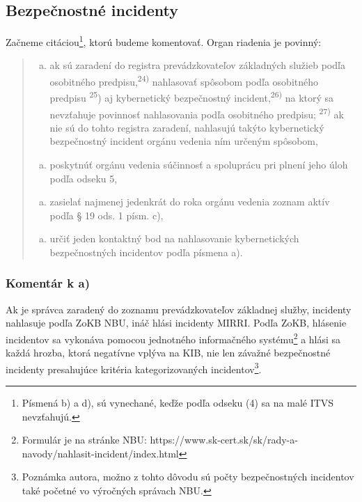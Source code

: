 \subsection{Bezpečnostné incidenty}
Začneme citáciou\footnote{Písmená b) a d), sú vynechané, keďže podľa odseku (4) sa na malé \acrshort{ITVS} nevzťahujú.},
ktorú budeme komentovať. Organ riadenia je povinný\cite[\S 23 ods. (3)]{95/2019}:
\begin{quote}
  \begin{enumerate}[a)]
    \item ak sú zaradení do registra prevádzkovateľov základných služieb podľa osobitného predpisu,\textsuperscript{24)}
      nahlasovať spôsobom podľa osobitného predpisu \textsuperscript{25}) aj kybernetický bezpečnostný incident,\textsuperscript{26)}
      na ktorý sa nevzťahuje povinnosť nahlasovania podľa osobitného predpisu; \textsuperscript{27)} ak nie sú do tohto registra
      zaradení, nahlasujú takýto kybernetický bezpečnostný incident orgánu vedenia ním určeným spôsobom,
  \end{enumerate}
  \begin{enumerate}[c)]
    \item poskytnúť orgánu vedenia súčinnosť a spoluprácu pri plnení jeho úloh podľa odseku 5,
  \end{enumerate}
  \begin{enumerate}[e)]
    \item zasielať najmenej jedenkrát do roka orgánu vedenia zoznam aktív podľa § 19 ods. 1 písm. c),
  \end{enumerate}
  \begin{enumerate}[f)]
    \item určiť jeden kontaktný bod na nahlasovanie kybernetických bezpečnostných incidentov podľa písmena a).
  \end{enumerate}
\end{quote}

\subsubsection*{Komentár k a)}
Ak je správca zaradený do zoznamu prevádzkovateľov základnej služby, incidenty nahlasuje podľa \acrshort{ZoKB} \acrshort{NBU},
ináč hlási incidenty \acrshort{MIRRI}. Podľa \acrshort{ZoKB}, hlásenie incidentov sa vykonáva pomocou jednotného informačného
systému\footnote{Formulár je na stránke \acrshort{NBU}: https://www.sk-cert.sk/sk/rady-a-navody/nahlasit-incident/index.html}
a hlási sa každá hrozba, ktorá negatívne vplýva na \acrshort{KIB}, nie len závažné bezpečnostné incidenty presahujúce kritéria
kategorizovaných incidentov\footnote{Poznámka autora, možno z tohto dôvodu sú počty bezpečnostných incidentov také početné
vo výročných správach \acrshort{NBU}.}.

